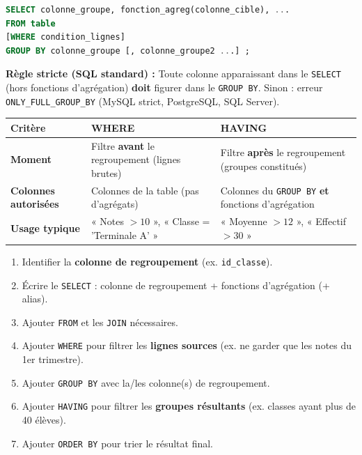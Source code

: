 \documentclass[11pt]{article}
\begin{document}
\begin{definition}
\begin{lstlisting}[language=SQL]
SELECT colonne_groupe, fonction_agreg(colonne_cible), ...
FROM table
[WHERE condition_lignes]
GROUP BY colonne_groupe [, colonne_groupe2 ...] ;
\end{lstlisting}
\textbf{Règle stricte (SQL standard) :} Toute colonne apparaissant dans le \texttt{SELECT} (hors fonctions d'agrégation) \textbf{doit} figurer dans le \texttt{GROUP BY}. Sinon : erreur \texttt{ONLY\_FULL\_GROUP\_BY} (MySQL strict, PostgreSQL, SQL Server).
\end{definition}

\begin{propriete}
\begin{center}
\begin{tabularx}{\linewidth}{|l|X|X|}
\hline
\rowcolor{popblueL}
\textbf{Critère} & \textbf{WHERE} & \textbf{HAVING} \\ \hline
\textbf{Moment} & Filtre \textbf{avant} le regroupement (lignes brutes) & Filtre \textbf{après} le regroupement (groupes constitués) \\ \hline
\textbf{Colonnes autorisées} & Colonnes de la table (pas d'agrégats) & Colonnes du \texttt{GROUP BY} \textbf{et} fonctions d'agrégation \\ \hline
\textbf{Usage typique} & « Notes $> 10$ », « Classe = 'Terminale A' » & « Moyenne $> 12$ », « Effectif $> 30$ » \\ \hline
\end{tabularx}
\end{center}
\end{propriete}

\begin{methode}
\begin{enumerate}
    \item Identifier la \textbf{colonne de regroupement} (ex. \texttt{id\_classe}).
    \item Écrire le \texttt{SELECT} : colonne de regroupement + fonctions d'agrégation (+ alias).
    \item Ajouter \texttt{FROM} et les \texttt{JOIN} nécessaires.
    \item Ajouter \texttt{WHERE} pour filtrer les \textbf{lignes sources} (ex. ne garder que les notes du 1er trimestre).
    \item Ajouter \texttt{GROUP BY} avec la/les colonne(s) de regroupement.
    \item Ajouter \texttt{HAVING} pour filtrer les \textbf{groupes résultants} (ex. classes ayant plus de 40 élèves).
    \item Ajouter \texttt{ORDER BY} pour trier le résultat final.
\end{enumerate}
\end{methode}
\end{document}
